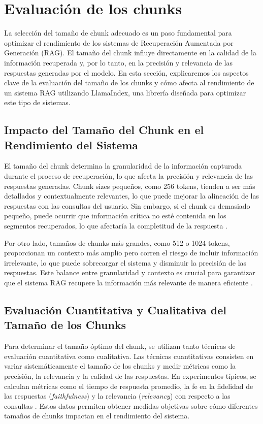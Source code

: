 \section{Evaluación de los chunks}

La selección del tamaño de chunk adecuado es un paso fundamental para optimizar el rendimiento de los sistemas de Recuperación Aumentada por Generación (RAG). El tamaño del chunk influye directamente en la calidad de la información recuperada y, por lo tanto, en la precisión y relevancia de las respuestas generadas por el modelo. En esta sección, explicaremos los aspectos clave de la evaluación del tamaño de los chunks y cómo afecta al rendimiento de un sistema RAG utilizando LlamaIndex, una librería diseñada para optimizar este tipo de sistemas.

\subsection{Impacto del Tamaño del Chunk en el Rendimiento del Sistema}
El tamaño del chunk determina la granularidad de la información capturada durante el proceso de recuperación, lo que afecta la precisión y relevancia de las respuestas generadas. Chunk sizes pequeños, como 256 tokens, tienden a ser más detallados y contextualmente relevantes, lo que puede mejorar la alineación de las respuestas con las consultas del usuario. Sin embargo, si el chunk es demasiado pequeño, puede ocurrir que información crítica no esté contenida en los segmentos recuperados, lo que afectaría la completitud de la respuesta \citep{llamaindex-blog}.

Por otro lado, tamaños de chunks más grandes, como 512 o 1024 tokens, proporcionan un contexto más amplio pero corren el riesgo de incluir información irrelevante, lo que puede sobrecargar el sistema y disminuir la precisión de las respuestas. Este balance entre granularidad y contexto es crucial para garantizar que el sistema RAG recupere la información más relevante de manera eficiente \citep{datacamp-eval}.

\subsection{Evaluación Cuantitativa y Cualitativa del Tamaño de los Chunks}
Para determinar el tamaño óptimo del chunk, se utilizan tanto técnicas de evaluación cuantitativa como cualitativa. Las técnicas cuantitativas consisten en variar sistemáticamente el tamaño de los chunks y medir métricas como la precisión, la relevancia y la calidad de las respuestas. En experimentos típicos, se calculan métricas como el tiempo de respuesta promedio, la fe en la fidelidad de las respuestas (\textit{faithfulness}) y la relevancia (\textit{relevancy}) con respecto a las consultas \citep{vectorize-eval}. Estos datos permiten obtener medidas objetivas sobre cómo diferentes tamaños de chunks impactan en el rendimiento del sistema.

